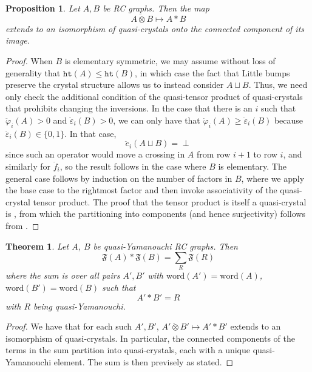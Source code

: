 \documentclass{amsart}
\newtheorem{proposition}[lemma]{Proposition}
\newtheorem{theorem}{Theorem}[section]
\theoremstyle{definition}
\theoremstyle{remark}
\numberwithin{equation}{subsection}
\newcommand{\QY}{\ensuremath{\mathbb{QY}}}
\newcommand{\hr}{\mathtt{ht}}
\newcommand{\BRC}{\mathcal{BRC}}
\newcommand{\RC}{\mathcal{RC}}
\newcommand{\maxd}{\mathfrak{m}}
\begin{document}
\begin{proposition}
  Let $A,B$ be RC graphs. Then the map
  $$A\ddot{\otimes} B\mapsto A * B$$
extends to an isomorphism of quasi-crystals onto the connected component of its image.
\end{proposition}
\begin{proof}
  When $B$ is elementary symmetric, we may assume without loss of generality that $\hr(A)\leq \hr(B)$, in which case the fact that Little bumps preserve the crystal structure allows us to instead consider $A\sqcup B$. Thus, we need only check the additional condition of the quasi-tensor product of quasi-crystals that prohibits changing the inversions. In the case that there is an $i$ such that $\ddot{\varphi}_i(A)>0$ and $\ddot{\varepsilon}_i(B)>0$, we can only have that $\ddot{\varphi}_i(A)\geq \ddot{\varepsilon}_i(B)$ because $\ddot{\varepsilon}_i(B)\in \{0,1\}$. In that case,
  $$\ddot{e}_i(A\sqcup B) = \perp$$
  since such an operator would move a crossing in $A$ from row $i+1$ to row $i$, and similarly for $\ddot{f}_i$, so the result follows in the case where $B$ is elementary. The general case follows by induction on the number of factors in $B$, where we apply the base case to the rightmost factor and then invoke associativity of the quasi-crystal tensor product. The proof that the tensor product is itself a quasi-crystal is \cite[Theorem~5.1]{cain2023quasicrystals}, from which the partitioning into components (and hence surjectivity) follows from \cite[Proposition~4.6]{cain2023quasicrystals}.
\end{proof}


\begin{theorem}
Let $A$, $B$ be quasi-Yamanouchi RC graphs. Then
$$\mathfrak{F}(A)*\mathfrak{F}(B) = \sum_{R} \mathfrak{F}(R)$$
where the sum is over all pairs $A',B'$ with $\mathrm{word}(A')=\mathrm{word}(A)$, $\mathrm{word}(B')=\mathrm{word}(B)$ such that 
$$A'*B'=R$$
with $R$ being quasi-Yamanouchi.
\end{theorem}
\begin{proof}
We have that for each such $A',B'$, $A'\ddot{\otimes} B'\mapsto A'*B'$ extends to an isomorphism of quasi-crystals. In particular, the connected components of the terms in the sum partition into quasi-crystals, each with a unique quasi-Yamanouchi element. The sum is then previsely as stated.
\end{proof}
\end{document}
